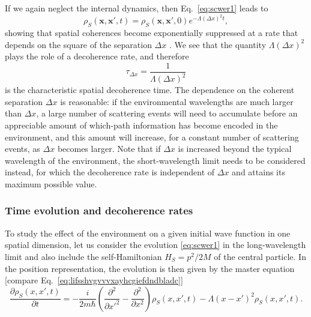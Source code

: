 \documentclass[3p,sort&compress]{elsarticle}
\newcommand{\E}{\ensuremath{e}}
\newcommand{\I}{\ensuremath{i}}
\newcommand{\op}[1]{#1}
\renewcommand{\vec}[1]{\ensuremath{\mathbf{#1}}}
\begin{document}
If we again neglect the internal dynamics, then Eq.~\eqref{eq:scwer1}  leads to
%
\begin{equation}\label{eq:scwer2}
\rho_S(\vec{x},\vec{x}',t) =
\rho_S(\vec{x},\vec{x}',0) \E^{-\Lambda (\Delta x)^2 t},
\end{equation}
%
showing that spatial coherences become exponentially suppressed at a rate that depends on the square of the separation $\Delta x$ \cite{Schlosshauer:2007:un}. We see that the quantity $\Lambda (\Delta x)^2$ plays the role of a decoherence rate, and therefore
%
\begin{equation}\label{eq:scwer6565}
  \tau_{\Delta x} = \frac{1}{\Lambda (\Delta x)^2}
\end{equation}
%
is the characteristic spatial decoherence time. The dependence on the coherent separation $\Delta x$ is reasonable: if the environmental wavelengths are much larger than $\Delta x$, a large number of scattering events will need to accumulate before an appreciable amount of which-path information has become encoded in the environment, and this amount will increase, for a constant number of scattering events, as $\Delta x$ becomes larger. Note that if $\Delta x$ is increased beyond the typical wavelength of the environment, the short-wavelength limit needs to be considered instead, for which the decoherence rate is independent of $\Delta x$ and attains its maximum possible value.

\subsubsection{Time evolution and decoherence rates}

To study the effect of the environment on a given initial wave function in one spatial dimension, let us consider the evolution \eqref{eq:scwer1} in the long-wavelength limit and also include the self-Hamiltonian $\op{H}_S=\op{p}^2/2M$ of the central particle. In the position representation, the evolution is then given by the master equation [compare Eq.~\eqref{eq:lifsshvgvvvxayhcgiefdndbladc}]
%
\begin{equation}\label{eq:scweraass1hallo} 
   \frac{\partial\rho_{S}(x,x',t)}{\partial t} =  -\frac{\I}{2m\hbar}
  \left(\frac{ \partial^2}{\partial x'^2} - \frac{ \partial^2}{\partial
      x^2} \right) \rho_{S}(x,x',t)  -  \Lambda
  (x-x')^2   \rho_{S}(x,x',t). 
\end{equation}
% 
\end{document}

